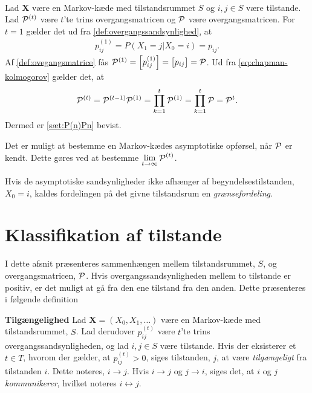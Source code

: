 \begin{bev}\textbf{}\\
Lad $\bm X$ være en Markov-kæde med tilstandsrummet $S$ og $i,j\in S$ være tilstande. Lad $\P^{(t)}$ være $t$'te trins overgangsmatricen og $\P$ være overgangsmatricen. For $t=1$ gælder det ud fra \autoref{def:overgangssandsynlighed}, at
\begin{align*}
    p_{ij}^{(1)} = P(X_1=j|X_0=i) = p_{ij}.
\end{align*}
Af \autoref{def:ovegangsmatrice} fås $\P^{(1)} = \left[p_{ij}^{(1)}\right] = \left[p_{ij}\right]= \P$. Ud fra \eqref{eq:chapman-kolmogorov} gælder det, at
\begin{align*}
    \P^{(t)}= \P^{(t-1)}\P^{(1)}=\prod_{k=1}^{t} \P^{(1)} = %
    \prod_{k=1}^{t} \P = \P^{t}.
\end{align*}
Dermed er \autoref{sæt:P(n)Pn} bevist.
\end{bev}

Det er muligt at bestemme en Markov-kædes asymptotiske opførsel, når $\P$ er kendt. Dette gøres ved at bestemme $\displaystyle \lim_{t \to \infty} \P^{(t)}$.

Hvis de asymptotiske sandsynligheder ikke afhænger af begyndelsestilstanden, $X_0=i$, kaldes fordelingen på det givne tilstandsrum en \textit{grænsefordeling}.


\section{Klassifikation af tilstande}

I dette afsnit præsenteres sammenhængen mellem tilstandsrummet, $S$, og overgangsmatricen, $\P$. Hvis overgangssandsynligheden mellem to tilstande er positiv, er det muligt at gå fra den ene tilstand fra den anden. Dette præsenteres i følgende definition

\begin{minipage}\textwidth
\begin{defn}\textbf{Tilgængelighed} \label{def:tilgængelighed} %
\newline
Lad $\bm X = (X_0, X_1, \dots)$ være en Markov-kæde med tilstandsrummet, $S$. Lad derudover $p_{ij}^{(t)}$ være $t$'te trins overgangssandsynligheden, og lad $i,j \in S$ være tilstande. Hvis der eksisterer et $t\in T$, hvorom der gælder, at $p_{ij}^{(t)}>0$, siges tilstanden, $j$, at være \textit{tilgængeligt} fra tilstanden $i$. Dette noteres, $i\to j$. Hvis $i\to j$ og $j\to i$, siges det, at $i$ og $j$ \textit{kommunikerer}, hvilket noteres $i\leftrightarrow j$.
\end{defn}
\end{minipage}

